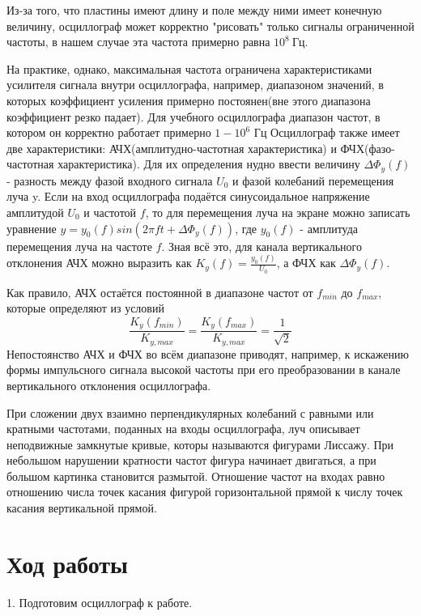 \documentclass[a4paper, 12pt]{article}
\begin{document}
		Из-за того, что пластины имеют длину и поле между ними имеет конечную величину, осциллограф может корректно "рисовать" только сигналы ограниченной частоты, в нашем случае эта частота примерно равна $10^8\: Гц$.
		
		На практике, однако, максимальная частота ограничена характеристиками усилителя сигнала внутри осциллографа, например, диапазоном значений, в которых коэффициент усиления примерно постоянен(вне этого диапазона коэффициент резко падает). Для учебного осциллографа диапазон частот, в котором он корректно работает  примерно $1-10^6$ Гц
		Осциллограф также имеет две характеристики: АЧХ(амплитудно-частотная характеристика)	и ФЧХ(фазо-частотная характеристика). Для их определения нудно ввести величину $\Delta \Phi_y (f)$ - разность между фазой входного сигнала $U_0$ и фазой колебаний перемещения луча y. Если на вход осциллографа подаётся синусоидальное напряжение амплитудой $U_0$ и частотой $f$, то для перемещения луча на экране можно записать уравнение $y =y_0(f)sin(2 \pi f t + \Delta \Phi_y(f))$, где $y_0(f)$ - амплитуда перемещения луча на частоте $f$. Зная всё это, для канала вертикального отклонения АЧХ можно выразить как $K_y(f) = \frac{y_0(f)}{U_0}$, а ФЧХ как $\Delta \Phi_y (f)$.
		
		Как правило, АЧХ остаётся постоянной в диапазоне частот от $f_{min}$ до $f_{max}$, которые определяют из условий 
		$$\frac{K_y(f_{min})}{K_{y,max}} = \frac{K_y(f_{max})}{K_{y,max}} = \frac{1}{\sqrt{2}}$$
		Непостоянство АЧХ и ФЧХ во всём диапазоне приводят, например, к искажению формы импульсного сигнала высокой частоты при его преобразовании в канале вертикального отклонения осциллографа.
		
		При сложении двух взаимно перпендикулярных колебаний с равными или кратными частотами, поданных на входы осциллографа, луч описывает неподвижные замкнутые кривые, которы называются фигурами Лиссажу. При небольшом нарушении кратности частот фигура начинает двигаться, а при большом картинка становится размытой. Отношение частот на входах равно отношению числа точек касания фигурой горизонтальной прямой к числу точек касания вертикальной прямой.
	\section*{Ход работы}
		1. Подготовим осциллограф к работе.
		
\end{document}

